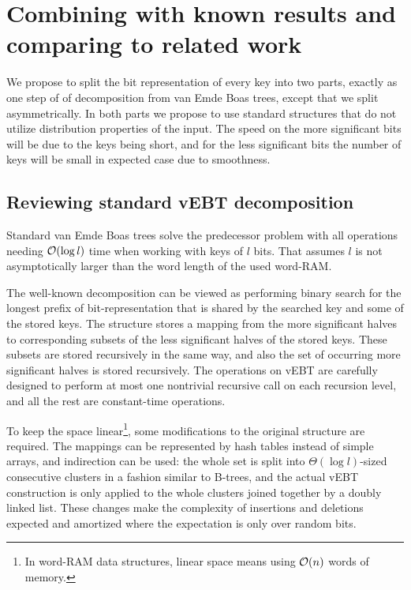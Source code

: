 \section{Combining with known results and comparing to related work \label{sec:main-results}}

We propose to split the bit representation of every key into two parts,
exactly as one step of of decomposition from van Emde Boas trees,
except that we split asymmetrically. In both parts we propose to use
standard structures that do not utilize distribution properties of
the input. The speed on the more significant bits will be due to the
keys being short, and for the less significant bits the number of
keys will be small in expected case due to smoothness.

\subsection{Reviewing standard vEBT decomposition}

Standard van Emde Boas trees solve the predecessor problem with all
operations needing $\mathcal O(\log l)$ time when working with keys of $l$
bits. That assumes $l$ is not asymptotically larger than the word
length of the used word-RAM.

The well-known decomposition can be viewed as performing binary search
for the longest prefix of bit-representation that is shared by the
searched key and some of the stored keys. The structure stores a mapping
from the more significant halves to corresponding subsets of the less
significant halves of the stored keys. These subsets are stored recursively
in the same way, and also the set of occurring more significant halves
is stored recursively. The operations on vEBT are carefully designed
to perform at most one nontrivial recursive call on each recursion
level, and all the rest are constant-time operations.

To keep the space linear\footnote{In word-RAM data structures, linear space means using $\mathcal O(n)$ words
of memory.}, some modifications to the original structure are required. The mappings
can be represented by hash tables instead of simple arrays, and indirection
can be used: the whole set is split into $\Theta(\log l)$-sized consecutive
clusters in a fashion similar to B-trees, and the actual vEBT construction
is only applied to the whole clusters joined together by a doubly
linked list. These changes make the complexity of insertions and deletions
expected and amortized where the expectation is only over random bits.

